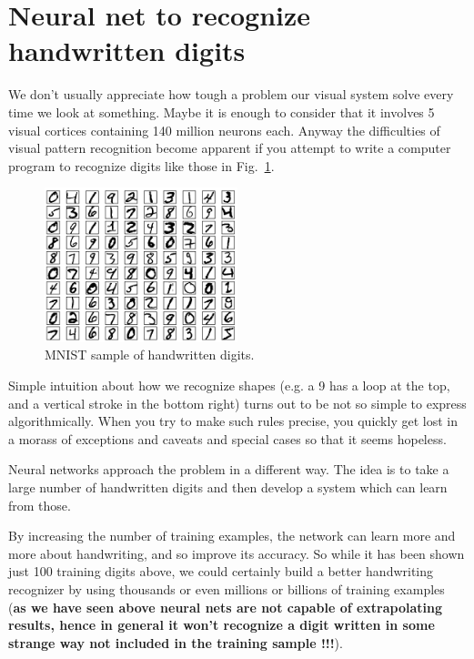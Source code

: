 \section{Neural net to recognize handwritten digits}
\label{neural-net-to-recognize-handwritten-digits}

We don't usually appreciate how tough a problem our visual system solve every time we look at something.
Maybe it is enough to consider that it involves 5 visual cortices containing 140 million neurons each. 
Anyway the difficulties of visual pattern recognition become apparent if you attempt to write a computer
program to recognize digits like those in Fig.~\ref{fig:mnist}.

\begin{figure}[htb]
	\centering
	\includegraphics[width=0.5\textwidth]{figures/mnist_100_digits}
	\caption{MNIST sample of handwritten digits.}
	\label{fig:mnist}
\end{figure}

Simple intuition about how we recognize shapes (e.g. a 9 has a loop at
the top, and a vertical stroke in the bottom right) turns out to be not
so simple to express algorithmically. When you try to make such rules
precise, you quickly get lost in a morass of exceptions and caveats and
special cases so that it seems hopeless.

Neural networks approach the problem in a different way. The idea is to
take a large number of handwritten digits and then develop a system
which can learn from those.

By increasing the number of training examples, the network can learn
more and more about handwriting, and so improve its accuracy. So while
it has been shown just 100 training digits above, we could certainly
build a better handwriting recognizer by using thousands or even
millions or billions of training examples (\textbf{as we have seen above
neural nets are not capable of extrapolating results, hence in general it won't
recognize a digit written in some strange way not included in the
training sample !!!}).

